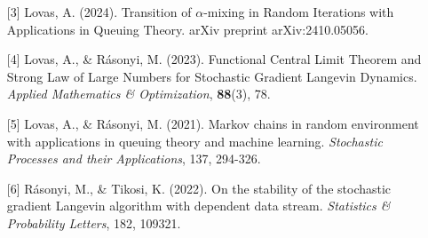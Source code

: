 \begin{talk}
\begin{enumerate}
	\item[{[3]}] Lovas, A. (2024). Transition of $\alpha $-mixing in Random Iterations with Applications in Queuing Theory. arXiv preprint arXiv:2410.05056.
	
	\item[{[4]}] Lovas, A., \& R\'asonyi, M. (2023). Functional Central Limit Theorem and Strong Law of Large Numbers for Stochastic Gradient Langevin Dynamics. {\it Applied Mathematics \& Optimization}, \textbf{88}(3), 78.
	
	\item[{[5]}] Lovas, A., \& R\'asonyi, M. (2021). Markov chains in random environment with applications in queuing theory and machine learning. {\it Stochastic Processes and their Applications}, 137, 294-326.
	
	\item[{[6]}] R\'asonyi, M., \& Tikosi, K. (2022). On the stability of the stochastic gradient Langevin algorithm with dependent data stream. {\it Statistics \& Probability Letters}, 182, 109321.
	
\end{enumerate}

\end{talk}

